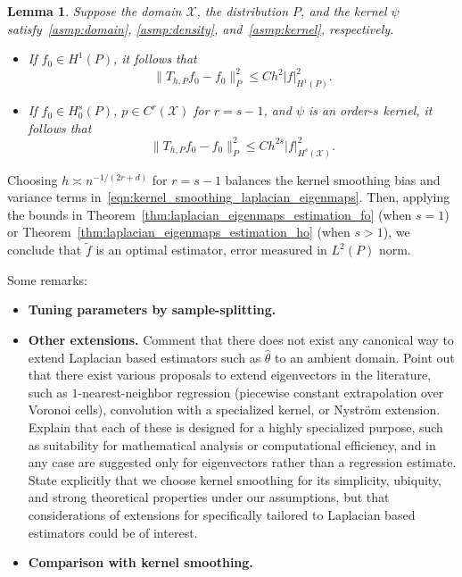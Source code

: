 \documentclass{article}
\newcommand{\1}{\mathbf{1}}
\newcommand{\mc}[1]{\mathcal{#1}}
\newcommand{\wt}[1]{\widetilde{#1}}
\newcommand{\wh}[1]{\widehat{#1}}
\theoremstyle{alden}
\theoremstyle{aldenthm}
\newtheorem{lemma}{Lemma}
\theoremstyle{definition}
\theoremstyle{remark}
\begin{document}
\begin{lemma}
	\label{lem:kernel_smoothing_bias}
	Suppose the domain $\mc{X}$, the distribution $P$, and the kernel $\psi$  satisfy~\ref{asmp:domain}, \ref{asmp:density}, and~\ref{asmp:kernel}, respectively. 
	\begin{itemize}
		\item If $f_0 \in H^1(P)$, it follows that
		\begin{equation*}
		\|T_{h,P}f_0 - f_0\|_P^2 \leq C h^{2} |f|_{H^1(P)}^2.
		\end{equation*}
		\item If $f_0 \in H_0^{s}(P)$, $p \in C^{r}(\mc{X})$ for $r = s - 1$, and $\psi$ is an order-$s$ kernel, it follows that
		\begin{equation*}
		\|T_{h,P}f_0 - f_0\|_P^2 \leq C h^{2s} |f|_{H^s(\mc{X})}^2.
		\end{equation*}
	\end{itemize}
\end{lemma}
Choosing $h \asymp n^{-1/(2r + d)}$ for $r = s - 1$ balances the kernel smoothing bias and variance terms in~\eqref{eqn:kernel_smoothing_laplacian_eigenmaps}. Then, applying the bounds in Theorem~\ref{thm:laplacian_eigenmaps_estimation_fo} (when $s = 1$) or Theorem~\ref{thm:laplacian_eigenmaps_estimation_ho} (when $s > 1$), we conclude that $\wt{f}$ is an optimal estimator, error measured in $L^2(P)$ norm.

Some remarks:
\begin{itemize}
	\item \textbf{Tuning parameters by sample-splitting.}
	\item \textbf{Other extensions.} Comment that there does not exist any canonical way to extend Laplacian based estimators such as $\wh{\theta}$ to an ambient domain. Point out that there exist various proposals to extend eigenvectors in the literature, such as $1$-nearest-neighbor regression (piecewise constant extrapolation over Voronoi cells), convolution with a specialized kernel, or Nystr\"{o}m extension. Explain that each of these is designed for a highly specialized purpose, such as suitability for mathematical analysis or computational efficiency, and in any case are suggested only for eigenvectors rather than a regression estimate. State explicitly that we choose kernel smoothing for its simplicity, ubiquity, and strong theoretical properties under our assumptions, but that considerations of extensions for specifically tailored to Laplacian based estimators could be of interest.
	\item \textbf{Comparison with kernel smoothing.}
\end{itemize}
\end{document}
